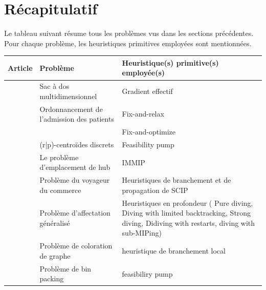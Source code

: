 \documentclass[12pt,a4paper,oneside]{book}
\theoremstyle{definition}
\begin{document}
	\section{Récapitulatif}
	Le tableau suivant résume tous les problèmes vus dans les sections précédentes. Pour chaque problème, les heuristiques primitives employées sont mentionnées.
	    \begin{center}
                \begin{tabularx}{1\textwidth}{|X|X|X|}
                    \hline
                    Article & Problème & Heuristique(s) primitive(s) employée(s)\\ 
                    \hline
                    \hline
                    \cite{Toyoda1975} & Sac à dos multidimensionnel & Gradient effectif \\  \hline
                    \cite{Turhan2017}& Ordonnancement de l'admission des patients & Fix-and-relax \\
                    && Fix-and-optimize\\ \hline 
                    \cite{Alekseeva2010} & (r|p)-centroïdes discrets & Feasibility pump \\ \hline 
                    \cite{He2015} & Le problème d'emplacement de hub & IMMIP \\ \hline
                    \cite{hansknecht2018cuts} & Problème du voyageur du commerce & Heuristiques de branchement et de propagation de SCIP \\ \hline
                    \cite{sadykov2018primal} & Problème d'affectation généralisé & Heuristiques en profondeur ( Pure diving, Diving with limited backtracking, Strong diving, Didiving with restarts, diving with sub-MIPing)\\
                    &Problème de coloration de graphe& heuristique de branchement local \\
                    &Problème de bin packing& feasibiliry pump \\ \hline
                    
            \end{tabularx}    
        \end{center}
        
    
\end{document}
